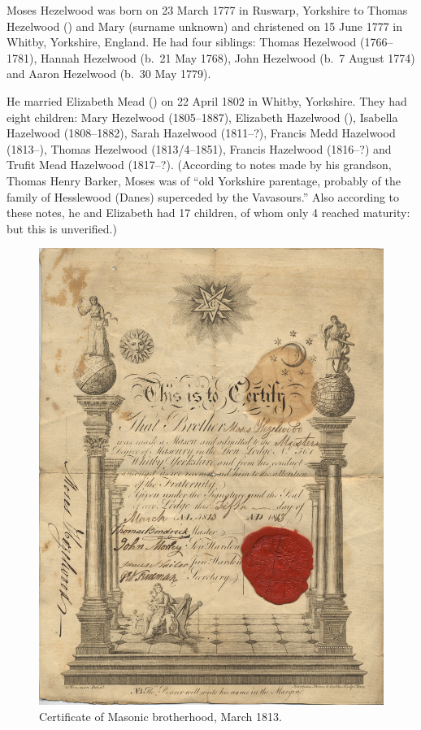 
Moses Hezelwood was born on 23 March 1777 in Ruswarp, Yorkshire to Thomas Hezelwood () and Mary (surname unknown) and christened on 15 June 1777 in	Whitby, Yorkshire, England.\cite{MHezelwoodBirth} He had four siblings: Thomas Hezelwood (1766--1781), Hannah Hezelwood (b.\ 21 May 1768), John Hezelwood (b.\ 7 August 1774) and Aaron Hezelwood (b.\ 30 May 1779).

He married Elizabeth Mead () on 22 April 1802 in	Whitby, Yorkshire.\cite{MHezelwoodMarriage}  They had eight children: Mary Hezelwood (1805--1887), Elizabeth Hazelwood (), Isabella Hazelwood (1808--1882), Sarah Hazelwood (1811--?), Francis Medd Hazelwood (1813--), Thomas Hezelwood (1813/4--1851), Francis Hazelwood (1816--?) and Trufit Mead Hazelwood (1817--?). (According to notes made by his grandson, Thomas Henry Barker, Moses  was of ``old Yorkshire parentage, probably of the family of Hesslewood (Danes) superceded by the Vavasours.'' Also according to these notes, he and Elizabeth had 17 children, of whom only 4 reached maturity: but this is unverified.)

\begin{figure}
 \centering
 \includegraphics{sources/MosesHezelwoord_MasonicCert_1813.png}
 \caption{Certificate of Masonic brotherhood, March 1813.}
\end{figure}

